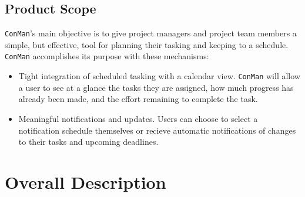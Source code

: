 \documentclass{article}
\begin{document}
\subsection{Product Scope}
\texttt{ConMan}'s main objective is to give project managers and project team members a simple, but effective, tool for planning their tasking and keeping to a schedule.  
\texttt{ConMan} accomplishes its purpose with these mechanisms:
\begin{itemize}
    \item Tight integration of scheduled tasking with a calendar view.  \texttt{ConMan} will allow a user to see at a glance the tasks they are assigned, how much progress has already been made, and the effort remaining to complete the task.
    \item Meaningful notifications and updates.  Users can choose to select a notification schedule themselves or recieve automatic notifications of changes to their tasks and upcoming deadlines.
\end{itemize}



\newpage
\section{Overall Description}
\end{document}

